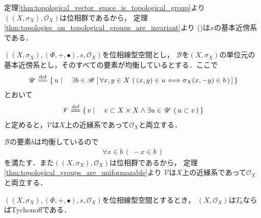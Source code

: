 	\begin{sketch}
		定理\ref{thm:topological_vector_space_is_topological_group}より
		$\left(\left(X,\sigma_X\right),\mathscr{O}_X\right)$は位相群であるから，
		定理\ref{thm:topologies_on_topological_groups_are_invariant}より
		()は$x$の基本近傍系である．
		\QED
	\end{sketch}
	
	\begin{screen}
		\begin{thm}[位相線型空間は一様化可能である]\label{thm:topological_vector_spaces_are_uniformazable}
			$\left(\left(X,\sigma_X\right),(\Phi,+,\bullet),s,\mathscr{O}_X\right)$を位相線型空間とし，
			$\mathscr{B}$を$\left(X,\sigma_X\right)$の単位元の基本近傍系とし，そのすべての要素が均衡しているとする．ここで
			\begin{align}
				\mathscr{U} \defeq \Set{u}{\exists b \in \mathscr{B}\,
				\left[\, \forall x,y \in X\, \left(\, (x,y) \in u \Longleftrightarrow\sigma_X(x,-y) \in b\, \right)\, \right]}
			\end{align}
			とおいて
			\begin{align}
				\mathscr{V} \defeq \Set{v}{v \subset X \times X \wedge \exists u \in \mathscr{U}\, \left(\, u \subset v\, \right)}
			\end{align}
			と定めると，$\mathscr{V}$は$X$上の近縁系であって$\mathscr{O}_X$と両立する．
		\end{thm}
	\end{screen}
	
	\begin{sketch}
		$\mathscr{B}$の要素$b$は均衡しているので
		\begin{align}
			\forall x \in b\, (\, -x \in b\, )
		\end{align}
		を満たす．また$\left(\left(X,\sigma_X\right),\mathscr{O}_X\right)$は位相群であるから，
		定理\ref{thm:topological_groups_are_uniformazable}より
		$\mathscr{V}$は$X$上の近縁系であって$\mathscr{O}_X$と両立する．
		\QED
	\end{sketch}
	
	\begin{screen}
		\begin{thm}
			$\left(\left(X,\sigma_X\right),(\Phi,+,\bullet),s,\mathscr{O}_X\right)$を位相線型空間とするとき，
			$\left(X,\mathscr{O}_X\right)$は$T_0$ならばTychonoffである．
		\end{thm}
	\end{screen}
	
